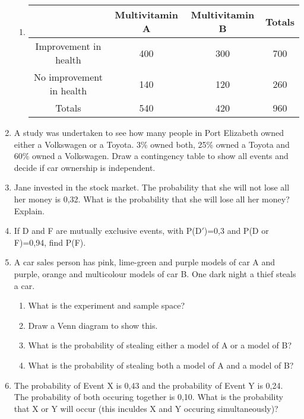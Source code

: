 \begin{enumerate}
\begin{enumerate}
	\item \begin{center}
\begin{tabular}{|c|c|c|c|}
\hline
                         & Multivitamin A & Multivitamin B & Totals \\
\hline
Improvement in health    & 400            & 300            & 700    \\
No improvement in health & 140            & 120            & 260    \\
\hline
Totals                   & 540            & 420            & 960    \\
\hline
\end{tabular}

\end{center}
	\end{enumerate}
\item A study was undertaken to see how many people in Port Elizabeth owned either a Volkswagen or a Toyota. 3\% owned both, 25\% owned a Toyota and 60\% owned a Volkswagen. Draw a contingency table to show all events and decide if car ownership is independent.
\item Jane invested in the stock market. The probability that she will not lose all her money is 0,32. What is the probability that she will lose all her money? Explain.
\item If D and F are mutually exclusive events, with P(D$'$)=0,3 and P(D or F)=0,94, find P(F).
\item A car sales person has pink, lime-green and purple models of car A and purple, orange and multicolour models of car B. One dark night a thief steals a car. 
	\begin{enumerate}
	\item What is the experiment and sample space? 
	\item Draw a Venn diagram to show this.
	\item What is the probability of stealing either a model of A or a model of B?
	\item What is the probability of stealing both a model of A and a model of B?
	\end{enumerate}
\item The probability of Event X is 0,43 and the probability of Event Y is 0,24. The probability of both occuring together is 0,10. What is the probability that X or Y will occur (this inculdes X and Y occuring simultaneously)?  

\end{enumerate}
